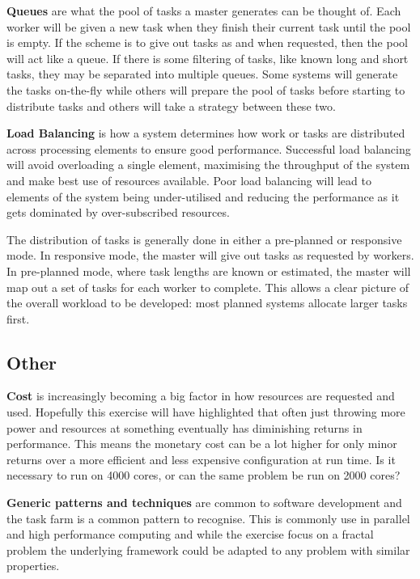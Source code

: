 \documentclass{article}
\begin{document}
\textbf{Queues} are what the pool of tasks a master generates can be
thought of. Each worker will be given a new task when they finish
their current task until the pool is empty. If the scheme is to give
out tasks as and when requested, then the pool will act like a
queue. If there is some filtering of tasks, like known long and short
tasks, they may be separated into multiple queues. Some systems will
generate the tasks on-the-fly while others will prepare the pool of
tasks before starting to distribute tasks and others will take a
strategy between these two.


\textbf{Load Balancing} is how a system determines how work or tasks
are distributed across processing elements to ensure good
performance. Successful load balancing will avoid overloading a single
element, maximising the throughput of the system and make best use of
resources available. Poor load balancing will lead to elements of the
system being under-utilised and reducing the performance as it gets
dominated by over-subscribed resources.


The distribution of tasks is generally done in either a pre-planned or
responsive mode. In responsive mode, the master will give out tasks as
requested by workers. In pre-planned mode, where task lengths are
known or estimated, the master will map out a set of tasks for each
worker to complete. This allows a clear picture of the overall
workload to be developed: most planned systems  allocate larger
tasks first.

\subsection{Other}

\textbf{Cost} is increasingly becoming a big factor in how resources
are requested and used. Hopefully this exercise will have highlighted
that often just throwing more power and resources at something
eventually has diminishing returns in performance. This means the
monetary cost can be a lot higher for only minor returns over a more
efficient and less expensive configuration at run time. Is it
necessary to run on 4000 cores, or can the same problem be run on 2000
cores?


\textbf{Generic patterns and techniques} are common to software
development and the task farm is a common pattern to recognise. This
is commonly use in parallel and high performance computing and while
the exercise focus on a fractal problem the underlying framework could
be adapted to any problem with similar properties.
\end{document}
